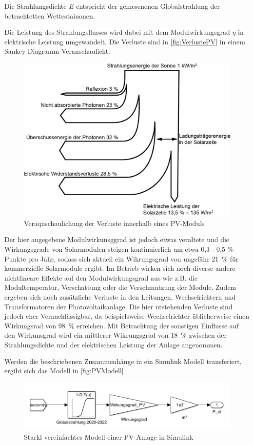 Die Strahlungsdichte $E$ entspricht der gemesenenen Globalstrahlung der betrachtetten Wettestaiuonen.

Die Leistung des Strahlungsflusses wird dabei mit dem Modulwirkungsgrad $\eta$ in elektrische Leistung umgewandelt. Die Verluste sind in \autoref{fig:VerlustePV} in einem Sankey-Diagramm Veranschaulicht. 

\begin{figure}[H]
	\centering
	\includegraphics[width=0.7\linewidth]{Abbildungen/WirkungsgradPV.png}
	\caption{Veraqnschaulichung der Verluste innerhalb eines PV-Moduls \cite{VerlustePV}}
	\label{fig:VerlustePV}
\end{figure}

Der hier angegebene Modulwirkunsggrad ist jedoch etwas veraltete und die Wirkungsgrade von Solarmodulen steigen kontinuierlich um etwa 0,3 - 0,5 \%-Punkte pro Jahr, sodass sich aktuell ein Wikrungsgrad von ungefähr 21~\% für kommerzielle Solarmodule ergibt. Im Betrieb wirken sich noch diverse andere nichtlineare Effekte auf den Modulwirkungsgrad aus wie z.B. die Modultemperatur, Verschattung oder die Verschmutzung der Module. Zudem ergeben sich noch zusätzliche Verluste in den Leitungen, Wechselrichtern und Transformatoren der Photovoltaikanlage. Die hier ntstehenden Verluste sind jedoch eher Vernachlässigbar, da beispielsweise Wechselrichter üblicherweise einen Wirkungsrad von 98~\% erreichen. Mit Betrachtung der sonstigen Einflusse auf den Wirkunsgrad wird ein mittlerer Wikrungsgrad von 18~\% zwischen der Strahlungsdichte und der elektrischen Leistung der Anlage angenommen. \cite{FaktenPV} 

Werden die beschriebenen Zusammenhänge in ein Simulink Modell transferiert, ergibt sich das Modell in \autoref{fig:PVModell}

\begin{figure}[H]
	\centering
	\includegraphics[width=0.9\linewidth]{Abbildungen/PVModell.png}
	\caption{Starkl vereinfachtes Modell einer PV-Anlage in Simulink}
	\label{fig:PVModell}
\end{figure}


